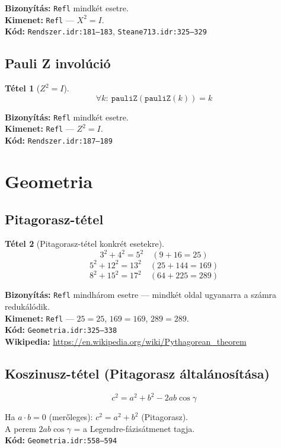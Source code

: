 \documentclass[12pt,a4paper]{article}
\newtheorem{tetel}{Tétel}
\begin{document}
\textbf{Bizonyítás:} \texttt{Refl} mindkét esetre.\\
\textbf{Kimenet:} \texttt{Refl} — $X^2 = I$.\\
\textbf{Kód:} \texttt{Rendszer.idr:181--183}, \texttt{Steane713.idr:325--329}

\subsection{Pauli Z involúció}

\begin{tetel}[$Z^2 = I$]
$$\forall k:\ \texttt{pauliZ}(\texttt{pauliZ}(k)) = k$$
\end{tetel}

\textbf{Bizonyítás:} \texttt{Refl} mindkét esetre.\\
\textbf{Kimenet:} \texttt{Refl} — $Z^2 = I$.\\
\textbf{Kód:} \texttt{Rendszer.idr:187--189}

\section{Geometria}

\subsection{Pitagorasz-tétel}

\begin{tetel}[Pitagorasz-tétel konkrét esetekre]
$$3^2 + 4^2 = 5^2 \quad (9 + 16 = 25)$$
$$5^2 + 12^2 = 13^2 \quad (25 + 144 = 169)$$
$$8^2 + 15^2 = 17^2 \quad (64 + 225 = 289)$$
\end{tetel}

\textbf{Bizonyítás:} \texttt{Refl} mindhárom esetre — mindkét oldal ugyanarra a számra redukálódik.\\
\textbf{Kimenet:} \texttt{Refl} — $25 = 25$, $169 = 169$, $289 = 289$.\\
\textbf{Kód:} \texttt{Geometria.idr:325--338}\\
\textbf{Wikipedia:} \url{https://en.wikipedia.org/wiki/Pythagorean_theorem}

\subsection{Koszinusz-tétel (Pitagorasz általánosítása)}

$$c^2 = a^2 + b^2 - 2ab\cos\gamma$$

Ha $a \cdot b = 0$ (merőleges): $c^2 = a^2 + b^2$ (Pitagorasz).\\
A perem $2ab\cos\gamma$ = a Legendre-fázisátmenet tagja.\\
\textbf{Kód:} \texttt{Geometria.idr:558--594}
\end{document}
